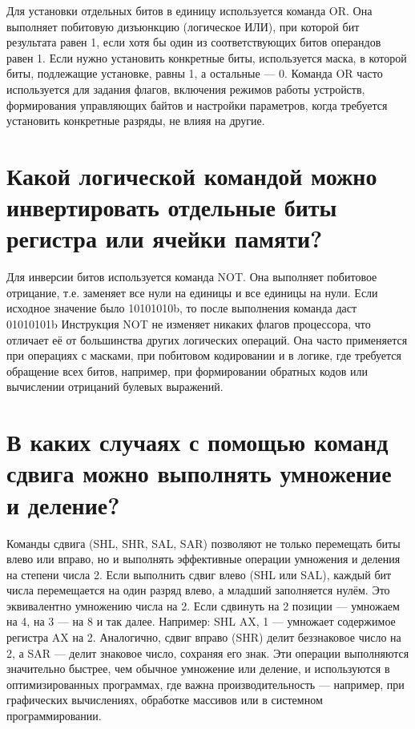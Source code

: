 Для установки отдельных битов в единицу используется команда OR.
Она выполняет побитовую дизъюнкцию (логическое ИЛИ), при которой бит результата равен 1, если хотя бы один из соответствующих битов операндов равен 1.
Если нужно установить конкретные биты, используется маска, в которой биты, подлежащие установке, равны 1, а остальные — 0.
Команда OR часто используется для задания флагов, включения режимов работы устройств, формирования управляющих байтов и настройки параметров, когда требуется установить конкретные разряды, не влияя на другие.


\section{Какой логической командой можно инвертировать отдельные биты регистра или ячейки памяти?}

Для инверсии битов используется команда NOT.
Она выполняет побитовое отрицание, т.е.
заменяет все нули на единицы и все единицы на нули.
Если исходное значение было 10101010b, то после выполнения команда даст 01010101b
Инструкция NOT не изменяет никаких флагов процессора, что отличает её от большинства других логических операций.
Она часто применяется при операциях с масками, при побитовом кодировании и в логике, где требуется обращение всех битов, например, при формировании обратных кодов или вычислении отрицаний булевых выражений.


\section{В каких случаях с помощью команд сдвига можно выполнять умножение и деление?}

Команды сдвига (SHL, SHR, SAL, SAR) позволяют не только перемещать биты влево или вправо, но и выполнять эффективные операции умножения и деления на степени числа 2.
Если выполнить сдвиг влево (SHL или SAL), каждый бит числа перемещается на один разряд влево, а младший заполняется нулём.
Это эквивалентно умножению числа на 2.
Если сдвинуть на 2 позиции — умножаем на 4, на 3 — на 8 и так далее.
Например:
SHL AX, 1 — умножает содержимое регистра AX на 2.
Аналогично, сдвиг вправо (SHR) делит беззнаковое число на 2, а SAR — делит знаковое число, сохраняя его знак.
Эти операции выполняются значительно быстрее, чем обычное умножение или деление, и используются в оптимизированных программах, где важна производительность — например, при графических вычислениях, обработке массивов или в системном программировании.

